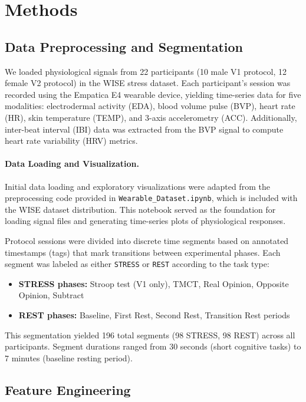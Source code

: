\documentclass[12pt,letterpaper]{article}
\begin{document}
\section{Methods}

\subsection{Data Preprocessing and Segmentation}

We loaded physiological signals from 22 participants (10 male V1 protocol, 12 female V2 protocol) in the WISE stress dataset. Each participant's session was recorded using the Empatica E4 wearable device, yielding time-series data for five modalities: electrodermal activity (EDA), blood volume pulse (BVP), heart rate (HR), skin temperature (TEMP), and 3-axis accelerometry (ACC). Additionally, inter-beat interval (IBI) data was extracted from the BVP signal to compute heart rate variability (HRV) metrics.

\paragraph{Data Loading and Visualization.} Initial data loading and exploratory visualizations were adapted from the preprocessing code provided in \texttt{Wearable\_Dataset.ipynb}, which is included with the WISE dataset distribution. This notebook served as the foundation for loading signal files and generating time-series plots of physiological responses.

Protocol sessions were divided into discrete time segments based on annotated timestamps (tags) that mark transitions between experimental phases. Each segment was labeled as either \texttt{STRESS} or \texttt{REST} according to the task type:

\begin{itemize}
    \item \textbf{STRESS phases:} Stroop test (V1 only), TMCT, Real Opinion, Opposite Opinion, Subtract
    \item \textbf{REST phases:} Baseline, First Rest, Second Rest, Transition Rest periods
\end{itemize}

This segmentation yielded 196 total segments (98 STRESS, 98 REST) across all participants. Segment durations ranged from 30 seconds (short cognitive tasks) to 7 minutes (baseline resting period).

\subsection{Feature Engineering}
\end{document}
